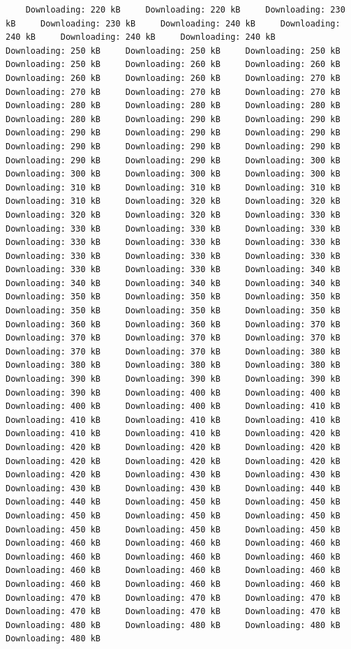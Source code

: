 \documentclass[
]{book}
\begin{document}
\begin{verbatim}
    Downloading: 220 kB     Downloading: 220 kB     Downloading: 230 kB     Downloading: 230 kB     Downloading: 240 kB     Downloading: 240 kB     Downloading: 240 kB     Downloading: 240 kB     Downloading: 250 kB     Downloading: 250 kB     Downloading: 250 kB     Downloading: 250 kB     Downloading: 260 kB     Downloading: 260 kB     Downloading: 260 kB     Downloading: 260 kB     Downloading: 270 kB     Downloading: 270 kB     Downloading: 270 kB     Downloading: 270 kB     Downloading: 280 kB     Downloading: 280 kB     Downloading: 280 kB     Downloading: 280 kB     Downloading: 290 kB     Downloading: 290 kB     Downloading: 290 kB     Downloading: 290 kB     Downloading: 290 kB     Downloading: 290 kB     Downloading: 290 kB     Downloading: 290 kB     Downloading: 290 kB     Downloading: 290 kB     Downloading: 300 kB     Downloading: 300 kB     Downloading: 300 kB     Downloading: 300 kB     Downloading: 310 kB     Downloading: 310 kB     Downloading: 310 kB     Downloading: 310 kB     Downloading: 320 kB     Downloading: 320 kB     Downloading: 320 kB     Downloading: 320 kB     Downloading: 330 kB     Downloading: 330 kB     Downloading: 330 kB     Downloading: 330 kB     Downloading: 330 kB     Downloading: 330 kB     Downloading: 330 kB     Downloading: 330 kB     Downloading: 330 kB     Downloading: 330 kB     Downloading: 330 kB     Downloading: 330 kB     Downloading: 340 kB     Downloading: 340 kB     Downloading: 340 kB     Downloading: 340 kB     Downloading: 350 kB     Downloading: 350 kB     Downloading: 350 kB     Downloading: 350 kB     Downloading: 350 kB     Downloading: 350 kB     Downloading: 360 kB     Downloading: 360 kB     Downloading: 370 kB     Downloading: 370 kB     Downloading: 370 kB     Downloading: 370 kB     Downloading: 370 kB     Downloading: 370 kB     Downloading: 380 kB     Downloading: 380 kB     Downloading: 380 kB     Downloading: 380 kB     Downloading: 390 kB     Downloading: 390 kB     Downloading: 390 kB     Downloading: 390 kB     Downloading: 400 kB     Downloading: 400 kB     Downloading: 400 kB     Downloading: 400 kB     Downloading: 410 kB     Downloading: 410 kB     Downloading: 410 kB     Downloading: 410 kB     Downloading: 410 kB     Downloading: 410 kB     Downloading: 420 kB     Downloading: 420 kB     Downloading: 420 kB     Downloading: 420 kB     Downloading: 420 kB     Downloading: 420 kB     Downloading: 420 kB     Downloading: 420 kB     Downloading: 430 kB     Downloading: 430 kB     Downloading: 430 kB     Downloading: 430 kB     Downloading: 440 kB     Downloading: 440 kB     Downloading: 450 kB     Downloading: 450 kB     Downloading: 450 kB     Downloading: 450 kB     Downloading: 450 kB     Downloading: 450 kB     Downloading: 450 kB     Downloading: 450 kB     Downloading: 460 kB     Downloading: 460 kB     Downloading: 460 kB     Downloading: 460 kB     Downloading: 460 kB     Downloading: 460 kB     Downloading: 460 kB     Downloading: 460 kB     Downloading: 460 kB     Downloading: 460 kB     Downloading: 460 kB     Downloading: 460 kB     Downloading: 470 kB     Downloading: 470 kB     Downloading: 470 kB     Downloading: 470 kB     Downloading: 470 kB     Downloading: 470 kB     Downloading: 480 kB     Downloading: 480 kB     Downloading: 480 kB     Downloading: 480 kB     
\end{verbatim}
\end{document}
